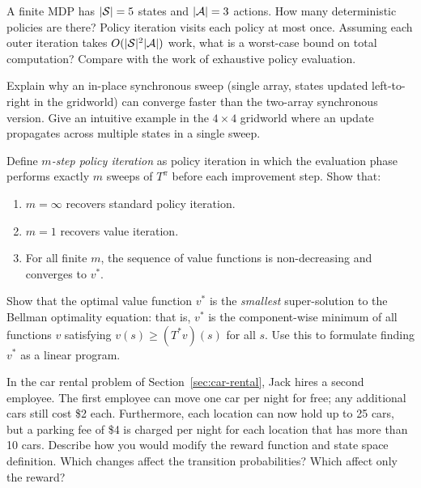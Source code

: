 \begin{exercise}
\label{ex:dp-number-of-policies}
A finite MDP has $|\mathcal{S}|=5$ states and $|\mathcal{A}|=3$ actions.  How many deterministic policies are there?  Policy iteration visits each policy at most once.  Assuming each outer iteration takes $O(|\mathcal{S}|^2|\mathcal{A}|)$ work, what is a worst-case bound on total computation?  Compare with the work of exhaustive policy evaluation.
\end{exercise}

\begin{exercise}
\label{ex:dp-async}
Explain why an in-place synchronous sweep (single array, states updated left-to-right in the gridworld) can converge faster than the two-array synchronous version.  Give an intuitive example in the $4\times4$ gridworld where an update propagates across multiple states in a single sweep.
\end{exercise}

\begin{exercise}
\label{ex:dp-truncated}
Define \emph{$m$-step policy iteration} as policy iteration in which the evaluation phase performs exactly $m$ sweeps of $T^\pi$ before each improvement step.  Show that:
\begin{enumerate}[label=(\alph*)]
  \item $m=\infty$ recovers standard policy iteration.
  \item $m=1$ recovers value iteration.
  \item For all finite $m$, the sequence of value functions is non-decreasing and converges to $v^*$.
\end{enumerate}
\end{exercise}

\begin{exercise}
\label{ex:dp-bellman-lp}
Show that the optimal value function $v^*$ is the \emph{smallest} super-solution to the Bellman optimality equation: that is, $v^*$ is the component-wise minimum of all functions $v$ satisfying $v(s) \ge (T^* v)(s)$ for all $s$.  Use this to formulate finding $v^*$ as a linear program.
\end{exercise}

\begin{exercise}
\label{ex:dp-car-rental}
In the car rental problem of Section~\ref{sec:car-rental}, Jack hires a second employee.  The first employee can move one car per night for free; any additional cars still cost \$2 each.  Furthermore, each location can now hold up to 25 cars, but a parking fee of \$4 is charged per night for each location that has more than 10 cars.  Describe how you would modify the reward function and state space definition.  Which changes affect the transition probabilities?  Which affect only the reward?
\end{exercise}

